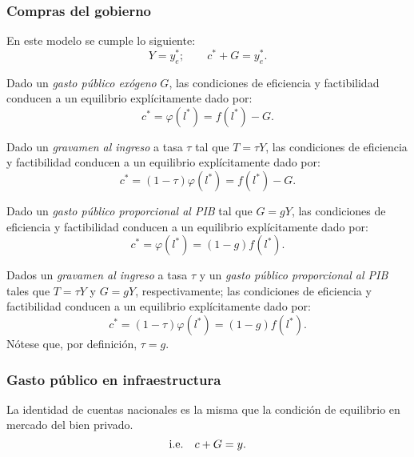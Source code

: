 \documentclass[8pt,a4paper]{extarticle}
\begin{document}
\begin{multicols}{3}
	\sectionbreak

	\subsubsection{Compras del gobierno}

	\begin{boxrmk}
		En este modelo se cumple lo siguiente:
		\[Y = y_e^*; \qquad c^* + G = y^*_e.\]
	\end{boxrmk}

	\begin{boxprop}
		Dado un \emph{gasto público exógeno} $G$, las condiciones de eficiencia y factibilidad conducen a un equilibrio explícitamente dado por:
		\[c^* = \varphi(l^*) = f(l^*) - G.\]
	\end{boxprop}

	\begin{boxprop}
		Dado un \emph{gravamen al ingreso} a tasa $\tau$ tal que $T = \tau Y$, las condiciones de eficiencia y factibilidad conducen a un equilibrio explícitamente dado por:
		\[c^* = (1 - \tau) \varphi(l^*) = f(l^*) - G.\]
	\end{boxprop}

	\begin{boxprop}
		Dado un \emph{gasto público proporcional al PIB} tal que $G = gY$, las condiciones de eficiencia y factibilidad conducen a un equilibrio explícitamente dado por:
		\[c^* = \varphi(l^*) = (1 - g)f(l^*).\]
	\end{boxprop}

	\begin{boxprop}
		Dados un \emph{gravamen al ingreso} a tasa $\tau$ y un \emph{gasto público proporcional al PIB} tales que $T = \tau Y$ y $G = gY$, respectivamente; las condiciones de eficiencia y factibilidad conducen a un equilibrio explícitamente dado por:
		\[c^* = (1 - \tau) \varphi(l^*) = (1 - g)f(l^*).\]
		Nótese que, por definición, $\tau = g$.
	\end{boxprop}

	\sectionbreak

	\subsubsection{Gasto público en infraestructura}

	\begin{boxrmk}
		La identidad de cuentas nacionales es la misma que la condición de equilibrio en mercado del bien privado.
		\[\text{\normalfont i.e.} \quad c + G = y.\]
	\end{boxrmk}


\end{multicols}
\end{document}
